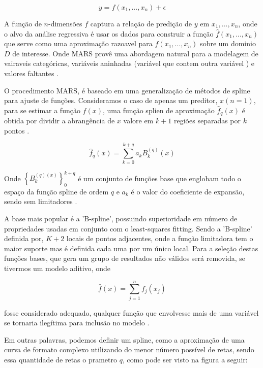 \documentclass[
    12pt,               %
    openright,          %
    oneside,            %
    a4paper,            %
    english,            %
    brazil              %
    ]{abntex2}
\begin{document}
\begin{equation}
    \label{mars_eq_base}
    y = f(x_1,...,x_n) + \epsilon
\end{equation}

A função de $n$-dimensões $f$ captura a relação de predição de $y$ em $x_1,...,x_n$, onde o alvo da análise regressiva
é usar os dados para construir a função $\hat{f}(x_1,...,x_n)$ que serve como uma aproximação razoavel para
$f(x_1,...,x_n)$ sobre um dominio $D$ de interesse. Onde MARS provê uma abordagem natural para a modelagem de vairaveis
categóricas, variáveis aninhadas (variável que contem outra variável ) e valores faltantes \cite{intro_mars}.

O procedimento MARS, é baseado em uma generalização de métodos de spline para ajuste de funções. Consideramos o caso de
apenas um preditor, $x (n = 1)$, para se estimar a função $f(x)$, uma função splien de aproximação $\hat{f}_q(x)$ é obtida por
dividir a abrangência de $x$ valore em $k+1$ regiões separadas por $k$ pontos \cite{intro_mars}.

\begin{equation}
    \label{funcao_spline_aproximacao}
    \hat{f}_q(x) = \sum_{k=0}^{k+q}a_kB_k^{(q)}(x)
\end{equation}

Onde $\left\{B_k^{(q)(x)}\right\}_{0}^{k+q}$ é um conjunto de funções base que englobam todo o espaço da função spline de ordem $q$ e $a_k$ é o
valor do coeficiente de expansão, sendo sem limitadores \cite{intro_mars}.

A base mais popular é a 'B-spline', possuindo superioridade em número de propriedades usadas em conjunto com o least-squares 
fitting. Sendo a 'B-spline' definida por, $K+2$ locais de pontos adjacentes, onde a função limitadora tem o maior suporte
mas é definida cada uma por um único local. Para a seleção destas funções bases, que gera um grupo de resultados
não válidos será removida, se tivermos um modelo aditivo, onde

\begin{equation}
    \hat{f}(x) = \sum_{j=1}^{n}f_j(x_j)
\end{equation}

fosse considerado adequado, qualquer função que envolvesse mais de uma variável se tornaria ilegítima para inclusão no modelo \cite{intro_mars}.

Em outras palavras, podemos definir um spline, como a aproximação de uma curva de formato complexo utilizando do 
menor número possível de retas, sendo essa quantidade de retas o prametro $q$, como pode ser visto na figura a seguir:
\end{document}
